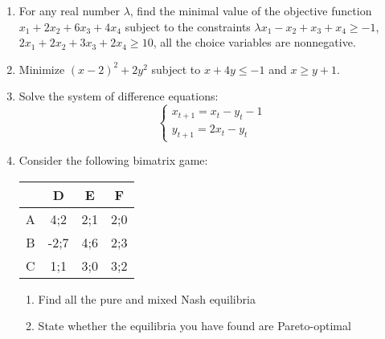 \documentclass[12pt,a4paper]{article}
\begin{document}
\begin{enumerate}

\item For any real number $\lambda$, find the minimal value of the objective function $x_1+2x_2+6x_3+4x_4$ subject to the constraints  $\lambda x_1-x_2+x_3+x_4\geq -1$, $2x_1+2x_2+3x_3+2x_4 \geq 10$,  all the choice variables are nonnegative. 


\item Minimize $(x-2)^2+2 y^2$ subject to $x+4y\leq -1$ and $x\geq y+1$.



\item Solve the system of difference equations:
\[
\begin{cases}
x_{t+1}=x_t-y_t - 1\\
y_{t+1}=2x_t-y_t
\end{cases}
\]

\item   Consider the following bimatrix game:


\begin{tabular}{c|ccc}
 & D & E & F \\ 
\hline 
A & 4;2 & 2;1 & 2;0  \\ 
B & -2;7 & 4;6 & 2;3  \\ 
C & 1;1 & 3;0 & 3;2  \\ 
\end{tabular} 

\begin{enumerate}
\item Find all the pure and mixed Nash equilibria
\item State whether the equilibria you have found are Pareto-optimal
\end{enumerate}

\end{enumerate}
\end{document}
